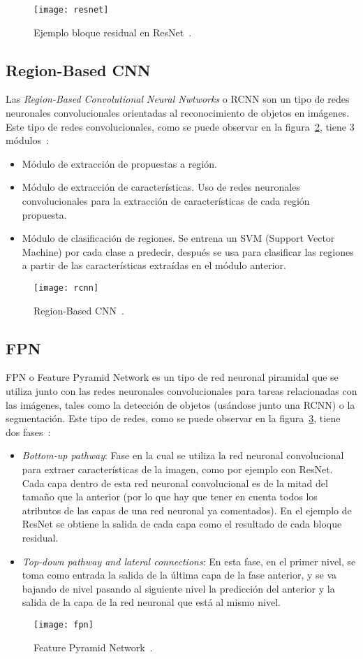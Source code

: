 \begin{figure}[h]
	\centering
	\texttt{[image: resnet]}
	\caption{Ejemplo bloque residual en ResNet~\cite{cnn}.}
	\label{fig:resnet}
\end{figure}
\subsection{Region-Based CNN}
Las \textit{Region-Based Convolutional Neural Nwtworks} o RCNN son un tipo de redes neuronales convolucionales orientadas al reconocimiento de objetos en imágenes. Este tipo de redes convolucionales, como se puede observar en la figura~\ref{fig:rcnn}, tiene 3 módulos~\cite{cnn}:
\begin{itemize}
	\item Módulo de extracción de propuestas a región.
	\item Módulo de extracción de características. Uso de redes neuronales convolucionales para la extracción de características de cada región propuesta.
	\item Módulo de clasificación de regiones. Se entrena un SVM (Support Vector Machine) por cada clase a predecir, después se usa para clasificar las regiones a partir de las características extraídas en el módulo anterior.
\end{itemize}
\begin{figure}[h]
	\centering
	\texttt{[image: rcnn]}
	\caption{Region-Based CNN~\cite{cnn}.}
	\label{fig:rcnn}
\end{figure}
\subsection{FPN}
FPN o Feature Pyramid Network es un tipo de red neuronal piramidal que se utiliza junto con las redes neuronales convolucionales para tareas relacionadas con las imágenes, tales como la detección de objetos (usándose junto una RCNN) o la segmentación. Este tipo de redes, como se puede observar en la figura~\ref{fig:fpn}, tiene dos fases~\cite{fpn}:
\begin{itemize}
	\item \textit{Bottom-up pathway}: Fase en la cual se utiliza la red neuronal convolucional para extraer características de la imagen, como por ejemplo con ResNet. Cada capa dentro de esta red neuronal convolucional es de la mitad del tamaño que la anterior (por lo que hay que tener en cuenta todos los atributos de las capas de una red neuronal ya comentados). En el ejemplo de ResNet se obtiene la salida de cada capa como el resultado de cada bloque residual.
	\item \textit{Top-down pathway and lateral connections}: En esta fase, en el primer nivel, se toma como entrada la salida de la última capa de la fase anterior, y se va bajando de nivel pasando al siguiente nivel la predicción del anterior y la salida de la capa de la red neuronal que está al mismo nivel.
\end{itemize}
\begin{figure}[h]
	\centering
	\texttt{[image: fpn]}
	\caption{Feature Pyramid Network~\cite{fpn}.}
	\label{fig:fpn}
\end{figure}

